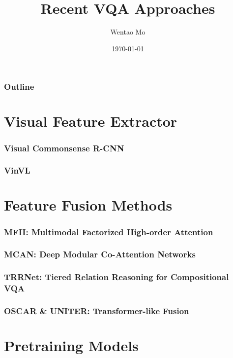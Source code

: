 \documentclass{beamer}
\title[PKUAI]{Recent VQA Approaches}
\author[Wentao Mo]
{Wentao Mo\inst{1}}
\institute[AI@PKU] 
{
    \inst{1}%
    Department of Machine Intelligence\\
    Peking University
}
\date[PKU]{\today}
\begin{document}
\frame{\titlepage}

\begin{frame}
    \frametitle{Outline}
    \tableofcontents
\end{frame}

\section{Visual Feature Extractor}

\begin{frame}
    \frametitle{Visual Commonsense R-CNN}

    

\end{frame}

\begin{frame}
    \frametitle{VinVL}

    

\end{frame}

\section{Feature Fusion Methods}

\begin{frame}
    \frametitle{MFH: Multimodal Factorized High-order Attention}

    

\end{frame}

\begin{frame}
    \frametitle{MCAN: Deep Modular Co-Attention Networks}

    

\end{frame}

\begin{frame}
    \frametitle{TRRNet: Tiered Relation Reasoning for Compositional VQA}

    

\end{frame}

\begin{frame}
    \frametitle{OSCAR \& UNITER: Transformer-like Fusion}

    

\end{frame}

\section{Pretraining Models}
\end{document}
